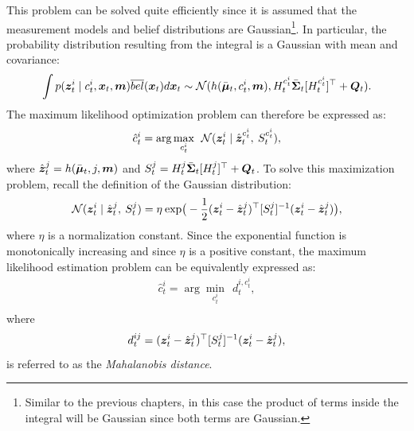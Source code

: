 This problem can be solved quite efficiently since it is assumed that the measurement models and belief distributions are Gaussian\footnote{Similar to the previous chapters, in this case the product of terms inside the integral will be Gaussian since both terms are Gaussian.}. In particular, the probability distribution resulting from the integral is a Gaussian with mean and covariance:
\begin{equation*}
\begin{split}
\int p(\bm{z}^i_{t}\mid c^i_{t},\bm{x}_t, \bm{m}) \overline{bel}(\bm{x}_t) d\bm{x}_t \sim \mathcal{N}(h(\bar{\bm{\mu}}_t, c_t^{i}, \bm{m}), H_t^{c_t^i} \bar{\bm{\Sigma}}_t [H_t^{c_t^i}]^\top  + \bm{Q}_t).
\end{split}
\end{equation*}
The maximum likelihood optimization problem can therefore be expressed as:
\begin{equation*}
\begin{split}
\hat{c}^i_{t} = \arg \max_{c^i_{t}} \:\:\mathcal{N}(\bm{z}_t^i \mid \hat{\bm{z}}^{c_t^i}_t,\: S_t^{c_t^i}), \\
\end{split}
\end{equation*}
where $\hat{\bm{z}}^{j}_t = h(\bar{\bm{\mu}}_t, j, \bm{m})$ and $S_t^j = H_t^{j} \bar{\bm{\Sigma}}_t [H_t^{j}]^\top  + \bm{Q}_t$.
To solve this maximization problem, recall the definition of the Gaussian distribution:
\begin{equation*}
\mathcal{N}(\bm{z}_t^i \mid \hat{\bm{z}}^{j}_t,\: S_t^{j}) = \eta\: \text{exp}\big( -\frac{1}{2}(\bm{z}_t^i-\hat{\bm{z}}^{j}_t)^\top  [S_t^{j}]^{-1} (\bm{z}_t^i-\hat{\bm{z}}^{j}_t) \big),
\end{equation*}
where $\eta$ is a normalization constant. Since the exponential function is monotonically increasing and since $\eta$ is a positive constant, the maximum likelihood estimation problem can be equivalently expressed as:
\begin{equation}
\begin{split}
\hat{c}^i_{t} = \arg \min_{c^i_{t}} \:\: d_t^{i,c^i_{t}}, \\
\end{split}
\end{equation}
where 
\begin{equation} \label{eq:mahalanobis}
d_t^{ij} = (\bm{z}_t^i-\hat{\bm{z}}^{j}_t)^\top  [S_t^{j}]^{-1} (\bm{z}_t^i-\hat{\bm{z}}^{j}_t),
\end{equation}
is referred to as the \textit{Mahalanobis distance}.

